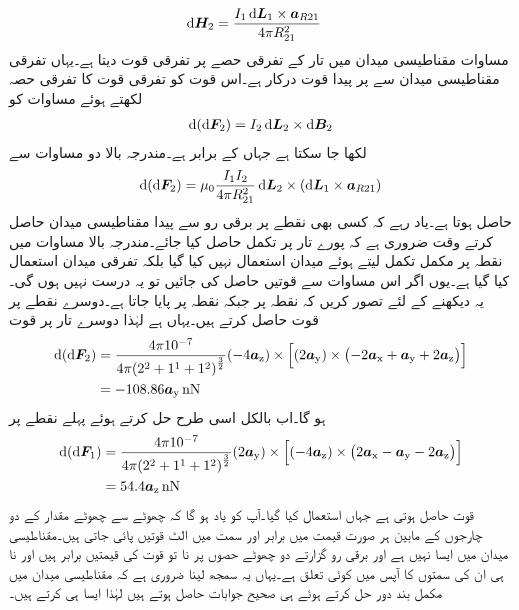 \begin{align*}
\dif \kvec{H}_2&=\frac{I_1 \dif \kvec{L}_1 \times \kvec{a}_{R21}}{4 \pi R_{21}^2}
\end{align*}
مساوات  مقناطیسی میدان  میں تار کے تفرقی حصے پر تفرقی قوت دیتا ہے۔یہاں تفرقی مقناطیسی میدان  سے  پر  پیدا قوت درکار ہے۔اس قوت کو تفرقی قوت کا تفرقی حصہ  لکھتے ہوئے مساوات  کو 
\begin{align*}
\dif \left(\dif \kvec{F}_2 \right)=I_2 \dif \kvec{L}_2 \times \dif \kvec{B}_2
\end{align*}
لکھا جا سکتا ہے جہاں  کے برابر ہے۔مندرجہ بالا دو مساوات سے
\begin{align}\label{مساوات_امالہ_تفرقی_تفرقی_قوت}
\dif \left(\dif \kvec{F}_2 \right)=\mu_0 \frac{I_1 I_2}{4\pi R_{21}^2} \dif \kvec{L}_2 \times \left(\dif \kvec{L}_1 \times \kvec{a}_{R21} \right)
\end{align}
حاصل ہوتا ہے۔یاد رہے کہ کسی بھی نقطے پر برقی رو سے پیدا مقناطیسی میدان حاصل کرتے وقت ضروری ہے کہ پورے تار پر تکمل حاصل کیا جائے۔مندرجہ بالا مساوات میں نقطہ  پر مکمل تکمل لیتے ہوئے میدان  استعمال نہیں کیا گیا بلکہ تفرقی میدان  استعمال کیا گیا ہے۔یوں اگر اس مساوات سے قوتیں حاصل کی جائیں تو یہ درست نہیں ہوں گی۔یہ دیکھنے کے لئے تصور کریں کہ نقطہ  پر  جبکہ نقطہ  پر  پایا جاتا ہے۔دوسرے نقطے پر قوت حاصل کرتے ہیں۔یہاں  ہے لہٰذا دوسرے تار پر قوت
\begin{align*}
\dif \left(\dif \kvec{F}_2 \right)&= \frac{4 \pi 10^{-7}}{4\pi {\left(2^2+1^1+1^2\right)}^\frac{3}{2}} (-4\az) \times \left[(2\ay) \times \left( -2\ax+\ay+2\az \right) \right]\\
&=-108.86 \ay \, \si{\nano \newton}
\end{align*}
ہو گا۔اب بالکل اسی طرح حل کرتے ہوئے پہلے نقطے پر
\begin{align*}
\dif \left(\dif \kvec{F}_1 \right)&= \frac{4 \pi 10^{-7}}{4\pi {\left(2^2+1^1+1^2\right)}^\frac{3}{2}} (2\ay)  \times \left[(-4\az)\times \left( 2\ax-\ay-2\az \right) \right]\\
&=54.4 \az \, \si{\nano \newton}
\end{align*}
 قوت حاصل ہوتی ہے جہاں  استعمال کیا گیا۔آپ کو یاد ہو گا کہ  چھوٹے سے چھوٹے مقدار کے دو چارجوں کے مابین ہر صورت قیمت میں برابر اور سمت میں الٹ قوتیں پائی جاتی ہیں۔مقناطیسی میدان میں ایسا نہیں ہے اور برقی رو گزارتے دو چھوٹے حصوں پر نا تو قوت کی قیمتیں برابر ہیں اور نا ہی ان کی سمتوں کا آپس میں کوئی تعلق ہے۔یہاں یہ سمجھ لینا ضروری ہے کہ مقناطیسی میدان میں مکمل بند دور حل کرتے ہوئے ہی صحیح جوابات حاصل ہوتے ہیں لہٰذا ایسا ہی کرتے ہیں۔

